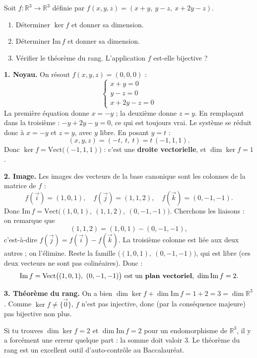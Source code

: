 \documentclass[11pt]{article}
\begin{document}
\begin{exoresolu}
Soit $f : \mathbb{R}^3 \to \mathbb{R}^3$ définie par $f(x, y, z) = (x + y,\ y - z,\ x + 2y - z)$.
\begin{enumerate}
\item Déterminer $\ker f$ et donner sa dimension.
\item Déterminer $\mathrm{Im}\, f$ et donner sa dimension.
\item Vérifier le théorème du rang. L'application $f$ est-elle bijective ?
\end{enumerate}
\tcblower
\textbf{1. Noyau.} On résout $f(x, y, z) = (0, 0, 0)$ :
\[
\begin{cases}
x + y = 0 \\
y - z = 0 \\
x + 2y - z = 0
\end{cases}
\]
La première équation donne $x = -y$ ; la deuxième donne $z = y$. En remplaçant dans la troisième : $-y + 2y - y = 0$, ce qui est toujours vrai. Le système se réduit donc à $x = -y$ et $z = y$, avec $y$ libre. En posant $y = t$ :
\[
(x, y, z) = (-t,\ t,\ t) = t\,(-1, 1, 1).
\]
Donc $\ker f = \mathrm{Vect}\big((-1, 1, 1)\big)$ : c'est une \textbf{droite vectorielle}, et $\dim \ker f = 1$.

\textbf{2. Image.} Les images des vecteurs de la base canonique sont les colonnes de la matrice de $f$ :
\[
f(\vec{i}) = (1, 0, 1), \quad f(\vec{j}) = (1, 1, 2), \quad f(\vec{k}) = (0, -1, -1).
\]
Donc $\mathrm{Im}\, f = \mathrm{Vect}\big((1,0,1),\ (1,1,2),\ (0,-1,-1)\big)$. Cherchons les liaisons : on remarque que
\[
(1, 1, 2) = (1, 0, 1) - (0, -1, -1),
\]
c'est-à-dire $f(\vec{j}) = f(\vec{i}) - f(\vec{k})$. La troisième colonne est liée aux deux autres ; on l'élimine. Reste la famille $\big((1, 0, 1),\ (0, -1, -1)\big)$, qui est libre (ces deux vecteurs ne sont pas colinéaires). Donc :
\[
\mathrm{Im}\, f = \mathrm{Vect}\big((1, 0, 1),\ (0, -1, -1)\big) \text{ est un \textbf{plan vectoriel}, } \dim \mathrm{Im}\, f = 2.
\]

\textbf{3. Théorème du rang.} On a bien $\dim \ker f + \dim \mathrm{Im}\, f = 1 + 2 = 3 = \dim \mathbb{R}^3$. Comme $\ker f \neq \{\vec{0}\}$, $f$ n'est pas injective, donc (par la conséquence majeure) pas bijective non plus.
\end{exoresolu}

\begin{attention}
Si tu trouves $\dim \ker f = 2$ et $\dim \mathrm{Im}\, f = 2$ pour un endomorphisme de $\mathbb{R}^3$, il y a forcément une erreur quelque part : la somme doit valoir $3$. Le théorème du rang est un excellent outil d'auto-contrôle au Baccalauréat.
\end{attention}
\end{document}
